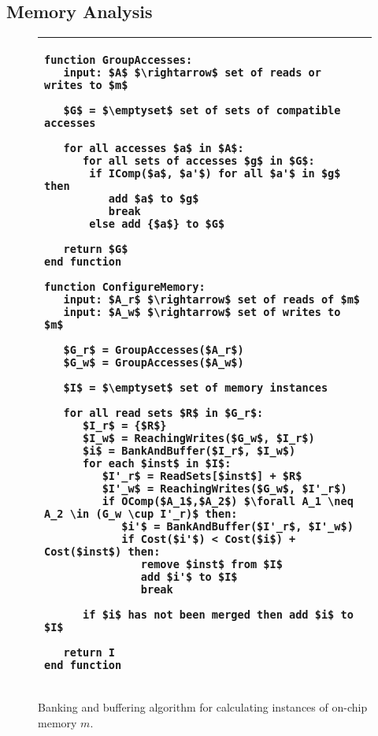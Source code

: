 \subsection{Memory Analysis}
\label{memopts}

\begin{figure}
\centering
\hspace{5pt}
\begin{tabular}{l}
\hline\hline

{\begin{lstlisting}[language=Pseudo,linewidth=0.98\columnwidth, mathescape=true]
function GroupAccesses:
   input: $A$ $\rightarrow$ set of reads or writes to $m$

   $G$ = $\emptyset$ set of sets of compatible accesses

   for all accesses $a$ in $A$:
      for all sets of accesses $g$ in $G$:
       if IComp($a$, $a'$) for all $a'$ in $g$ then
          add $a$ to $g$
          break
       else add {$a$} to $G$

   return $G$
end function

function ConfigureMemory:
   input: $A_r$ $\rightarrow$ set of reads of $m$
   input: $A_w$ $\rightarrow$ set of writes to $m$

   $G_r$ = GroupAccesses($A_r$)
   $G_w$ = GroupAccesses($A_w$)

   $I$ = $\emptyset$ set of memory instances

   for all read sets $R$ in $G_r$:
      $I_r$ = {$R$}
      $I_w$ = ReachingWrites($G_w$, $I_r$)
      $i$ = BankAndBuffer($I_r$, $I_w$)
      for each $inst$ in $I$:
         $I'_r$ = ReadSets[$inst$] + $R$
         $I'_w$ = ReachingWrites($G_w$, $I'_r$)
         if OComp($A_1$,$A_2$) $\forall A_1 \neq A_2 \in (G_w \cup I'_r)$ then:
            $i'$ = BankAndBuffer($I'_r$, $I'_w$)
            if Cost($i'$) < Cost($i$) + Cost($inst$) then:
               remove $inst$ from $I$
               add $i'$ to $I$
               break

      if $i$ has not been merged then add $i$ to $I$

   return I
end function
\end{lstlisting}}\\
\hline
\end{tabular}
\caption{Banking and buffering algorithm for calculating instances of on-chip memory $m$.}
\label{fig:bank_alg}
\end{figure}

